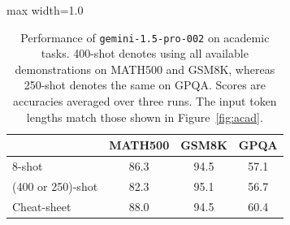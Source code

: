 \begin{table}[t]
\centering
\begin{adjustbox}{max width=1.0\columnwidth}
\begin{tabular}{lccc}
\toprule
 & \textbf{MATH500} & \textbf{GSM8K} & \textbf{GPQA} \\
\midrule
8-shot & 86.3 & 94.5 & 57.1 \\
(400 or 250)-shot & 82.3 & 95.1 & 56.7 \\
\midrule
Cheat-sheet & 88.0 & 94.5 & 60.4 \\
\bottomrule
\end{tabular}
\end{adjustbox}
\caption{
Performance of \texttt{gemini-1.5-pro-002} on academic tasks.
400-shot denotes using all available demonstrations on MATH500 and GSM8K, whereas 250-shot denotes the same on GPQA.
Scores are accuracies averaged over three runs.
The input token lengths match those shown in Figure~\ref{fig:acad}.
}
\label{tab:gemini_academic}
\end{table}